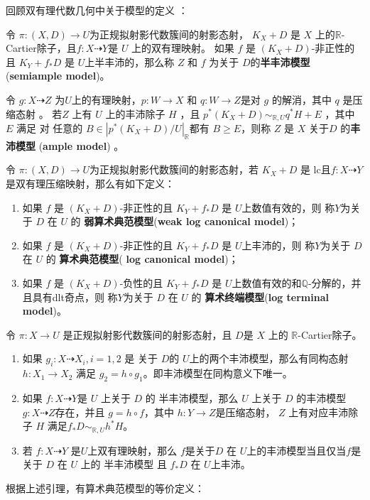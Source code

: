 回顾双有理代数几何中关于模型的定义 \citet{BCHM10}：
\begin{definition}
	\citet[Definition 3.6.5]{BCHM10} 令 $ \pi:(X,D)\to U $为正规拟射影代数簇间的射影态射， $K_{X}+D$ 是 $X$ 上的$\mathbb{R}$-Cartier除子，且$ f: X\dashrightarrow Y $是 $U$ 上的双有理映射。  如果 $ f $ 是 $ (K_X+D) $-非正性的且 $ K_Y+f_*D $ 是 $ U $上半丰沛的，那么称 $Z$ 和 $f$ 为关于 $D$的\textbf{半丰沛模型}(\textbf{semiample model})。

	令 $ g:X\dashrightarrow Z $ 为$ U $上的有理映射，$p:W \to X $ 和 $q:W \to Z $是对 $g$ 的解消，其中 $q$ 是压缩态射 。 若$Z$ 上有 $U$ 上的丰沛除子 $H$ ，且 $p^*(K_{X}+D) \sim_{\mathbb{R},U} q^*H+E$ ，其中 $E$  满足    对 任意的 $B \in |p^*(K_{X}+D)/U|_{\mathbb{R}}$都有 $B\geqslant E$，则称 $Z$ 是 $X$ 关于$D$ 的\textbf{丰沛模型} (\textbf{ample model}) 。
\end{definition}
\begin{definition}\label{models}
	\citet[Definition 3.6.7]{BCHM10} 令 $ \pi:(X,D)\to U $为正规拟射影代数簇间的射影态射，若 $ K_X+D $ 是 lc且$ f:X\dashrightarrow Y $是双有理压缩映射，那么有如下定义：
	\begin{enumerate}
		\item 如果 $f$ 是  $ (K_X+D) $-非正性的且 $ K_Y+f_*D $ 是 $ U $上数值有效的，则  称$ Y $为关于 $D$ 在 $U$ 的  \textbf{弱算术典范模型}(\textbf{weak log canonical model})；
		\item 如果 $f$ 是  $ (K_X+D) $-非正性的且 $ K_Y+f_*D $ 是 $ U $上丰沛的，则  称$ Y $为关于 $D$ 在 $U$ 的  \textbf{算术典范模型}(\textbf{ log canonical model})；
		\item 如果 $f$ 是  $ (K_X+D) $-负性的且 $ K_Y+f_*D $ 是 $ U $上数值有效的和$\mathbb{Q}$-分解的，并且具有dlt奇点，则  称$ Y $为关于 $D$ 在 $U$ 的  \textbf{算术终端模型}(\textbf{log terminal model})。
	\end{enumerate}
\end{definition}

\begin{lemma}\citet[lemma 3.6.6]{BCHM10}
	令 $\pi:X \to U$ 是正规拟射影代数簇间的射影态射，且 $D$是 $X$ 上的 $\mathbb{R}$-Cartier除子。

	\begin{enumerate}
		\item 如果 $g_{i}:X \dashrightarrow X_{i}, i=1,2$ 是 关于 $D$的  $U$上的两个丰沛模型，那么有同构态射 $h:X_{1}\to X_{2}$ 满足 $g_{2}=h \circ g_{1}$。即丰沛模型在同构意义下唯一。
		\item 如果 $f:X \dashrightarrow Y$是 $U$ 上关于 $D$ 的 半丰沛模型，那么 $U$ 上关于 $D$ 的丰沛模型 $g:X \dashrightarrow  Z$存在，并且 $g=h \circ f$，其中 $h:Y \to Z$是压缩态射， $Z$ 上有对应丰沛除子 $H$  满足$f_*D \sim_{\mathbb{R},U}h^*H$。
		\item  若 $f:X \dashrightarrow Y$  是$U$上双有理映射，那么 $f$是关于$D$ 在 $U$上的丰沛模型当且仅当$f$是关于 $D$ 在 $U$ 上的  半丰沛模型 且 $f_*D$ 在 $U$上丰沛。
	\end{enumerate}
\end{lemma}
根据上述引理，有算术典范模型的等价定义：

